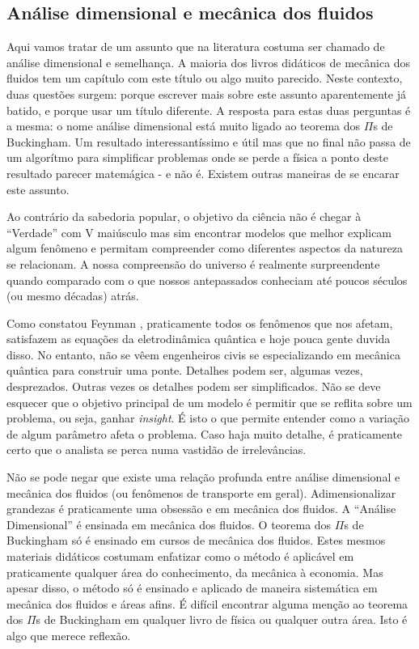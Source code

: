 \documentclass[article,12pt,oneside,a4paper,english,brazil,sumario=tradicional]{abntex2}
\begin{document}
\subsection{Análise dimensional e mecânica dos fluidos}

Aqui vamos tratar de um assunto que na literatura costuma ser chamado de análise dimensional e semelhança. A maioria dos livros didáticos de mecânica dos fluidos tem um capítulo com este título ou algo muito parecido. Neste contexto, duas questões surgem: porque escrever mais sobre este assunto aparentemente já batido, e porque usar um título diferente. A resposta para estas duas perguntas é a mesma: o nome análise dimensional está muito ligado ao teorema dos $\Pi$s de Buckingham. Um resultado interessantíssimo e útil mas que no final não passa de um algorítmo para simplificar problemas onde se perde a física a ponto deste resultado parecer matemágica - e não é. Existem outras maneiras de se encarar este assunto.

 Ao contrário da sabedoria popular, o objetivo da ciência não é chegar à ``Verdade'' com V maiúsculo mas sim encontrar modelos que melhor explicam algum fenômeno e permitam compreender como diferentes aspectos da natureza se relacionam. A nossa compreensão do universo é realmente surpreendente quando comparado com o que nossos antepassados conheciam até poucos séculos (ou mesmo décadas) atrás. 

Como constatou Feynman \cite{Feynman14}, praticamente todos os fenômenos que nos afetam, satisfazem as equações da eletrodinâmica quântica e hoje pouca gente duvida disso. No entanto, não se vêem engenheiros civis se especializando em mecânica quântica para construir uma ponte. Detalhes podem ser, algumas vezes, desprezados. Outras vezes os detalhes podem ser simplificados. Não se deve esquecer que o objetivo principal de um modelo é permitir que se reflita sobre um problema, ou seja, ganhar \emph{insight}. É isto o que permite entender como a variação de algum parâmetro afeta o problema. Caso haja muito detalhe, é praticamente certo que o analista se perca numa vastidão de irrelevâncias. 

Não se pode negar que existe uma relação profunda entre análise dimensional e mecânica dos fluidos (ou fenômenos de transporte em geral). Adimensionalizar grandezas é praticamente uma obsessão e em mecânica dos fluidos.  A ``Análise Dimensional'' é ensinada em mecânica dos fluidos. O teorema dos $\Pi$s de Buckingham só é ensinado em cursos de mecânica dos fluidos. Estes mesmos materiais didáticos costumam enfatizar como o método é aplicável em praticamente qualquer área do conhecimento, da mecânica à economia. Mas apesar disso, o método só é ensinado e aplicado de maneira sistemática em mecânica dos fluidos e áreas afins. É difícil encontrar alguma menção ao teorema dos $\Pi$s de Buckingham em qualquer livro de física ou qualquer outra área. Isto  é algo que merece reflexão.
\end{document}
